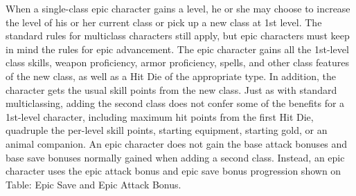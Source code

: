 \documentclass{article}
\begin{document}
When a single-class epic character gains a level, he or she may choose to increase 
the level of his or her current class or pick up a new class at 1st level. The 
standard rules for multiclass characters still apply, but epic characters must 
keep in mind the rules for epic advancement. The epic character gains all the 1st-level 
class skills, weapon proficiency, armor proficiency, spells, and other class features 
of the new class, as well as a Hit Die of the appropriate type. In addition, the 
character gets the usual skill points from the new class. Just as with standard 
multiclassing, adding the second class does not confer some of the benefits for 
a 1st-level character, including maximum hit points from the first Hit Die, quadruple 
the per-level skill points, starting equipment, starting gold, or an animal companion. 
An epic character does not gain the base attack bonuses and base save bonuses normally 
gained when adding a second class. Instead, an epic character uses the epic attack 
bonus and epic save bonus progression shown on Table: Epic Save and Epic Attack 
Bonus.

\newpage
\end{document}
